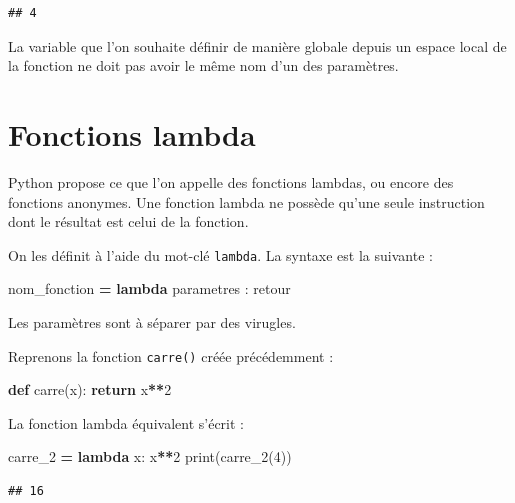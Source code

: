 \documentclass[12pt,]{book}
\newenvironment{Shaded}{\begin{snugshade}}{\end{snugshade}}
\newcommand{\KeywordTok}[1]{\textcolor[rgb]{0.13,0.29,0.53}{\textbf{#1}}}
\newcommand{\DecValTok}[1]{\textcolor[rgb]{0.00,0.00,0.81}{#1}}
\newcommand{\ControlFlowTok}[1]{\textcolor[rgb]{0.13,0.29,0.53}{\textbf{#1}}}
\newcommand{\OperatorTok}[1]{\textcolor[rgb]{0.81,0.36,0.00}{\textbf{#1}}}
\newcommand{\BuiltInTok}[1]{#1}
\newcommand{\NormalTok}[1]{#1}
\numberwithin{equation}{section}
\numberwithin{countremarque}{section}
\let\BeginKnitrBlock\begin \let\EndKnitrBlock\end
\begin{document}
\begin{lstlisting}
## 4
\end{lstlisting}

\BeginKnitrBlock{remarque}
La variable que l'on souhaite définir de manière globale depuis un
espace local de la fonction ne doit pas avoir le même nom d'un des
paramètres.
\EndKnitrBlock{remarque}

\section{Fonctions lambda}\label{fonctions-lambda}

Python propose ce que l'on appelle des fonctions lambdas, ou encore des
fonctions anonymes. Une fonction lambda ne possède qu'une seule
instruction dont le résultat est celui de la fonction.

On les définit à l'aide du mot-clé \texttt{lambda}. La syntaxe est la
suivante :

\begin{Shaded}
\begin{Highlighting}[]
\NormalTok{nom_fonction }\OperatorTok{=} \KeywordTok{lambda}\NormalTok{ parametres : retour}
\end{Highlighting}
\end{Shaded}

Les paramètres sont à séparer par des virugles.

Reprenons la fonction \texttt{carre()} créée précédemment :

\begin{Shaded}
\begin{Highlighting}[]
\KeywordTok{def}\NormalTok{ carre(x):}
  \ControlFlowTok{return}\NormalTok{ x}\OperatorTok{**}\DecValTok{2}
\end{Highlighting}
\end{Shaded}

La fonction lambda équivalent s'écrit :

\begin{Shaded}
\begin{Highlighting}[]
\NormalTok{carre_2 }\OperatorTok{=} \KeywordTok{lambda}\NormalTok{ x: x}\OperatorTok{**}\DecValTok{2}
\BuiltInTok{print}\NormalTok{(carre_2(}\DecValTok{4}\NormalTok{))}
\end{Highlighting}
\end{Shaded}

\begin{lstlisting}
## 16
\end{lstlisting}
\end{document}
